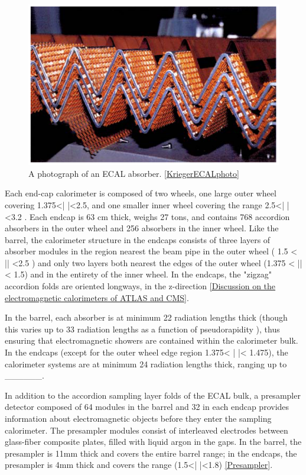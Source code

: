 \begin{figure}
  \includegraphics[width=\linewidth]{figures/detector_chapter/ECALphoto.png}
  \caption{A photograph of an ECAL absorber. \ref{KriegerECALphoto}}
  \label{fig:ECALphoto}
\end{figure}

Each end-cap calorimeter is composed of two wheels, one large outer wheel covering 1.375<| \eta |<2.5, and one smaller inner wheel covering the range 2.5<| \eta |<3.2 . Each endcap is 63 cm thick, weighs 27 tons, and contains 768 accordion absorbers in the outer wheel and 256 absorbers in the inner wheel. Like the barrel, the calorimeter structure in the endcaps consists of three layers of absorber modules in the region nearest the beam pipe in the outer wheel ( 1.5 < |\eta | <2.5 ) and only two layers both nearest the edges of the outer wheel (1.375 < |\eta | < 1.5) and in the entirety of the inner wheel. In the endcaps, the "zigzag" accordion folds are oriented longways, in the z-direction \ref{Discussion on the electromagnetic calorimeters of ATLAS and CMS}.

In the barrel, each absorber is at minimum 22 radiation lengths thick (though this varies up to 33 radiation lengths as a function of pseudorapidity \eta), thus ensuring that electromagnetic showers are contained within the calorimeter bulk. In the endcaps (except for the outer wheel edge region  1.375< | \eta |< 1.475), the calorimeter systems are at minimum 24 radiation lengths thick, ranging up to ______.

In addition to the accordion sampling layer folds of the ECAL bulk, a presampler detector composed of 64 modules in the barrel and 32 in each endcap provides information about electromagnetic objects before they enter the sampling calorimeter. The presampler modules consist of interleaved electrodes between glass-fiber composite plates, filled with liquid argon in the gaps. In the barrel, the presampler is 11mm thick and covers the entire barrel range; in the endcaps, the presampler is 4mm thick and covers the range (1.5<| \eta |<1.8) \ref{Presampler}.

